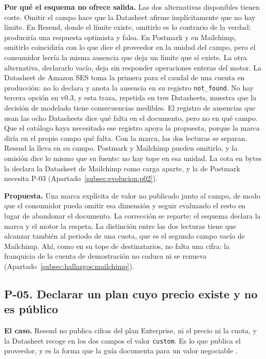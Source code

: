 \textbf{Por qué el esquema no ofrece salida.} Las dos alternativas disponibles tienen coste.
Omitir el campo hace que la Datasheet afirme implícitamente que no hay límite.
En Resend, donde el límite existe, omitirlo es lo contrario de la verdad: produciría una respuesta optimista y falsa.
En Postmark y en Mailchimp, omitirlo coincidiría con lo que dice el proveedor en la unidad del campo, pero el consumidor leería la misma ausencia que deja un límite que sí existe.
La otra alternativa, declararlo vacío, deja sin responder operaciones enteras del motor.
La Datasheet de Amazon SES toma la primera para el caudal de una cuenta en producción: no lo declara y anota la ausencia en su registro \texttt{not\_found}.
No hay tercera opción en v0.3, y esta traza, repetida en tres Datasheets, muestra que la decisión de modelado tiene consecuencias medibles.
El registro de ausencias que usan las ocho Datasheets dice qué falta en el documento, pero no en qué campo.
Que el catálogo haya necesitado ese registro apoya la propuesta, porque la marca diría en el propio campo qué falta.
Con la marca, las dos lecturas se separan.
Resend la lleva en su campo.
Postmark y Mailchimp pueden omitirlo, y la omisión dice lo mismo que su fuente: no hay tope en esa unidad.
La cota en bytes la declara la Datasheet de Mailchimp como carga aparte, y la de Postmark necesita P-03 (Apartado~\ref{subsec:evolucion:p02}).

\textbf{Propuesta.} Una marca explícita de valor no publicado junto al campo, de
modo que el consumidor pueda omitir esa dimensión y seguir evaluando el resto en
lugar de abandonar el documento. La corrección se reparte: el esquema declara la
marca y el motor la respeta.
La distinción entre las dos lecturas tiene que alcanzar también al periodo de una cuota, que es el segundo campo vacío de Mailchimp.
Ahí, como en su tope de destinatarios, no falta una cifra: la franquicia de la cuenta de demostración no caduca ni se renueva (Apartado~\ref{subsec:hallazgos:mailchimp}).

\subsection{P-05. Declarar un plan cuyo precio existe y no es público}
\label{subsec:evolucion:p05}

\textbf{El caso.} Resend no publica cifras del plan Enterprise, ni el precio ni la cuota, y la Datasheet recoge en los dos campos el valor \texttt{custom}.
Es lo que publica el proveedor, y es la forma que la guía documenta para un valor negociable \citep{apisconsumptionmodel}.

